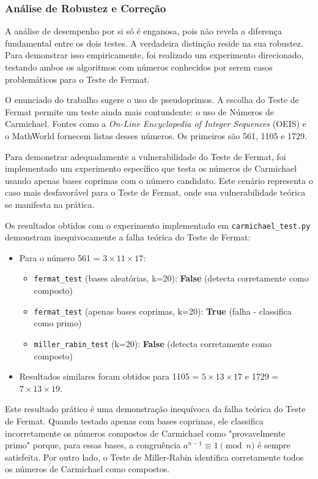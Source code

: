 \documentclass[a4paper, 11pt]{article}
\begin{document}
\subsubsection{Análise de Robustez e Correção}

A análise de desempenho por si só é enganosa, pois não revela a diferença fundamental entre os dois testes. A verdadeira distinção reside na sua robustez. Para demonstrar isso empiricamente, foi realizado um experimento direcionado, testando ambos os algoritmos com números conhecidos por serem casos problemáticos para o Teste de Fermat.

O enunciado do trabalho sugere o uso de pseudoprimos. A escolha do Teste de Fermat permite um teste ainda mais contundente: o uso de Números de Carmichael. Fontes como a \textit{On-Line Encyclopedia of Integer Sequences} (OEIS) e o MathWorld fornecem listas desses números. Os primeiros são 561, 1105 e 1729.

Para demonstrar adequadamente a vulnerabilidade do Teste de Fermat, foi implementado um experimento específico que testa os números de Carmichael usando apenas bases coprimas com o número candidato. Este cenário representa o caso mais desfavorável para o Teste de Fermat, onde sua vulnerabilidade teórica se manifesta na prática.

Os resultados obtidos com o experimento implementado em \texttt{carmichael\_test.py} demonstram inequivocamente a falha teórica do Teste de Fermat:

\begin{itemize}
    \item Para o número 561 = $3 \times 11 \times 17$:
    \begin{itemize}
        \item \texttt{fermat\_test} (bases aleatórias, k=20): \textbf{False} (detecta corretamente como composto)
        \item \texttt{fermat\_test} (apenas bases coprimas, k=20): \textbf{True} (falha - classifica como primo)
        \item \texttt{miller\_rabin\_test} (k=20): \textbf{False} (detecta corretamente como composto)
    \end{itemize}

    \item Resultados similares foram obtidos para 1105 = $5 \times 13 \times 17$ e 1729 = $7 \times 13 \times 19$.
\end{itemize}

Este resultado prático é uma demonstração inequívoca da falha teórica do Teste de Fermat. Quando testado apenas com bases coprimas, ele classifica incorretamente os números compostos de Carmichael como "provavelmente primo" porque, para essas bases, a congruência $a^{n-1} \equiv 1 \pmod{n}$ é sempre satisfeita. Por outro lado, o Teste de Miller-Rabin identifica corretamente todos os números de Carmichael como compostos.
\end{document}
